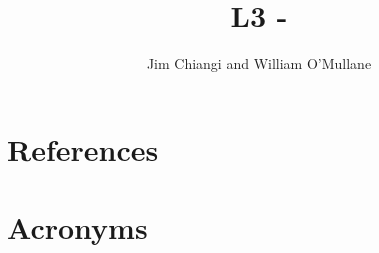 \documentclass[OPS,authoryear,toc]{lsstdoc}
\title{L3 - \milestone}
\author{%
Jim Chiangi and William O'Mullane
}
\date{\vcsDate}
\begin{document}
\maketitle



\appendix
\section{References} \label{sec:bib}
\renewcommand{\refname}{} %


\section{Acronyms} \label{sec:acronyms}

\end{document}

